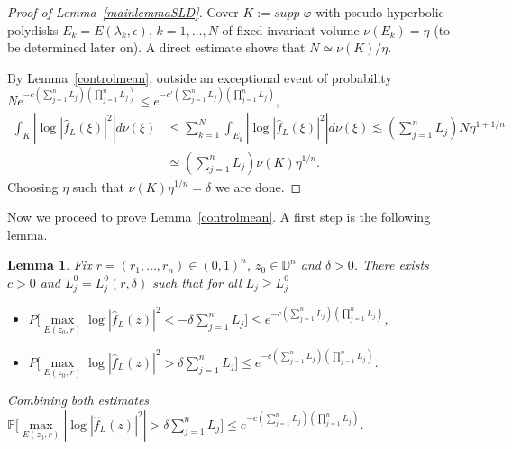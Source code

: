 \documentclass[12pt,twoside,final,amsfonts]{amsart}
\theoremstyle{plain}
\newtheorem{lemma}[theorem]{Lemma}
\theoremstyle{definition}
\theoremstyle{definition}
\begin{document}
\begin{proof}[Proof of Lemma~\ref{mainlemmaSLD}] Cover $K:=supp\; \varphi$ with pseudo-hyperbolic polydisks $E_k=E(\lambda_k,{\epsilon})$, $k=1,\dots,N$ of fixed invariant volume $\nu(E_k)=\eta$ (to be determined later on). A direct estimate shows that $N\simeq \nu(K)/\eta$.

By Lemma~\ref{controlmean}, outside an exceptional event of probability $Ne^{-c{(\sum_{j=1}^n L_j)(\prod_{j=1}^n L_j)}}\leq e^{-c'{(\sum_{j=1}^n L_j)(\prod_{j=1}^n L_j)}}$,
\begin{align*}
\int_{K}\left|\log|\hat f_L(\xi)|^2\right|d\nu(\xi)&\leq \sum^{N}_{k=1}\int_{E_k}\left|\log |\hat f_L(\xi)|^2 \right|d\nu(\xi) \lesssim 
({\sum_{j=1}^n L_j}) N \eta^{1+1/n}\\
& \simeq ({\sum_{j=1}^n L_j}) \nu(K) \eta^{1/n}.
\end{align*}
Choosing $\eta$ such that $\nu(K)\eta^{1/n}=\delta$ we are done.
\end{proof}

Now we proceed to prove Lemma~\ref{controlmean}. A first step is the following lemma.

\begin{lemma}\label{controlmax}
Fix $r=(r_1,\dots,r_n)\in (0,1)^n$, $z_0\in{\mathbb{D}}^n$ and $\delta>0$. There exists $c>0$ and $L_j^0=L_j^0(r,\delta)$ such that for all $L_j\geq L_j^0$
\begin{itemize}
 \item[(a)] $P \bigl[\max\limits_{E(z_0,r)}\log|\hat f_L(z)|^2<-\delta {\sum_{j=1}^n L_j} \bigr]\leq e^{-c{(\sum_{j=1}^n L_j)(\prod_{j=1}^n L_j)} }$,
 \item[(b)] $P \bigl[\max\limits_{E(z_0,r)}\log|\hat f_L(z)|^2>\delta {\sum_{j=1}^n L_j} \bigr]\leq e^{-c{(\sum_{j=1}^n L_j)(\prod_{j=1}^n L_j)}}$.
\end{itemize}
Combining both estimates $\mathbb P\bigl[\max\limits_{E(z_0,r)}\left|\log |\hat f_L(z)|^2\right|>\delta {\sum_{j=1}^n L_j} \bigr]\leq e^{-c{(\sum_{j=1}^n L_j)(\prod_{j=1}^n L_j)}}$.

\end{lemma}
\end{document}
